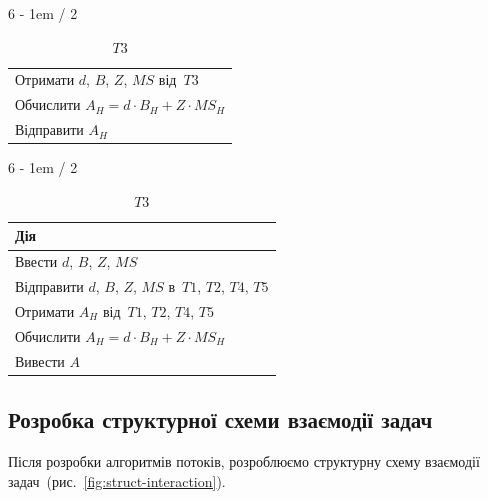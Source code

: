\documentclass[
  a4paper,
  oneside,
  BCOR = 10mm,
  DIV = 12,
  12pt,
  headings = normal,
]{scrartcl}
\newlength{\gridunitwidth}
\begin{document}
\begin{table}[!htbp]
\begin{subtable}[b]{6 \gridunitwidth - 1em / 2}
\begin{tabular}{
						v{\columnwidth - 2\tabcolsep}
					}
						\midrule
							Отримати $d$, $B$, $Z$, $MS$ від~$T3$\\
							Обчислити $A_{H} = d \cdot B_{H} + Z \cdot MS_{H}$\\
							Відправити $A_{H}$\\
						\bottomrule
					\end{tabular}
				\end{subtable}
				\begin{subtable}[b]{6 \gridunitwidth - 1em / 2}
					\caption{$T3$}
					\begin{tabular}{
						v{\columnwidth - 2\tabcolsep}
					}
						\toprule
							Дія\\
						\midrule
							Ввести $d$, $B$, $Z$, $MS$\\
							Відправити $d$, $B$, $Z$, $MS$ в~$T1$, $T2$, $T4$, $T5$\\
							Отримати $A_{H}$ від~$T1$, $T2$, $T4$, $T5$\\
							Обчислити $A_{H} = d \cdot B_{H} + Z \cdot MS_{H}$\\
							Вивести $A$\\
						\bottomrule
					\end{tabular}
				\end{subtable}
			\end{table}

    \subsection{Розробка структурної схеми взаємодії задач}
      Після розробки алгоритмів потоків, розроблюємо структурну схему взаємодії задач~(рис.~\ref{fig:struct-interaction}).
\end{document}

